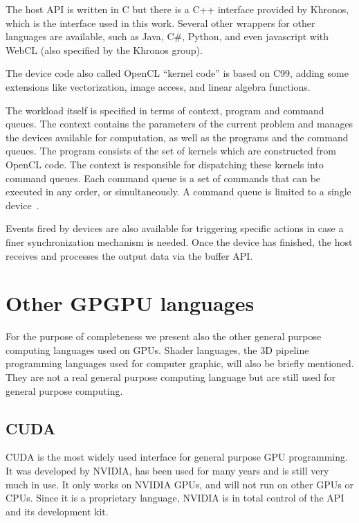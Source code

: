 The host \gls{API} is written in C but there is a C++ interface provided by Khronos, which is the interface used in this work. Several other wrappers for other languages are available, such as Java, C\#, Python, and even javascript with WebCL (also specified by the Khronos group). 

The device code also called \gls{OpenCL} ``kernel code'' is based on C99, adding some extensions like vectorization, image access, and linear algebra functions.

The workload itself is specified in terms of context, program and command queues. The context contains the parameters of the current problem and manages the devices available for computation, as well as the programs and the command queues. The program consists of the set of kernels which are constructed from \gls{OpenCL} code. The context is responsible for dispatching these kernels into command queues. Each command queue is a set of commands that can be executed in any order, or simultaneously. A command queue is limited to a single device~\cite{OpenCLInAction,OpenCLProgrammingGuide}.

Events fired by devices are also available for triggering specific actions in case a finer synchronization mechanism is needed. Once the device has finished, the host receives and processes the output data via the buffer \gls{API}.

\section{Other GPGPU languages}

For the purpose of completeness we present also the other general purpose computing languages used on \glspl{GPU}. Shader languages, the 3D pipeline programming languages used for computer graphic, will also be briefly mentioned. They are not a real general purpose computing language but are still used for general purpose computing.

\subsection{CUDA}

\Gls{CUDA} is the most widely used interface for general purpose \gls{GPU} programming. It was developed by NVIDIA, has been used for many years and is still very much in use. It only works on NVIDIA \glspl{GPU}, and will not run on other \glspl{GPU} or \glspl{CPU}. Since it is a proprietary language, NVIDIA is in total control of the API and its development kit.

